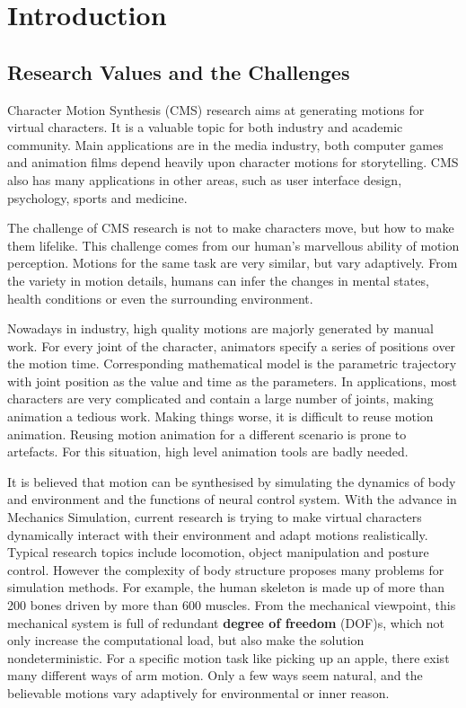 \chapter{Introduction}
\section{Research Values and the Challenges}
Character Motion Synthesis (CMS) research aims at generating motions for virtual characters.
It is a valuable topic for both industry and academic community. 
Main applications are in the media industry, both computer games and animation films depend heavily upon character motions for storytelling.  
CMS also has many applications in other areas, such as user interface design, psychology, sports and medicine.

The challenge of CMS research is not to make characters move, but how to make them lifelike. 
This challenge comes from our human's marvellous ability of motion perception. 
Motions for the same task are very similar, but vary adaptively.
From the variety in motion details, humans can infer the changes in mental states, health conditions or even the surrounding environment. 

Nowadays in industry, high quality motions are majorly generated by manual work. 
For every joint of the character, animators specify a series of positions over the motion time.
Corresponding mathematical model is the parametric trajectory with joint position as the value and time as the parameters.
In applications, most characters are very complicated and contain a large number of joints, making animation a tedious work.
Making things worse, it is difficult to reuse motion animation.
Reusing motion animation for a different scenario is prone to artefacts.
For this situation, high level animation tools are badly needed. 

It is believed that motion can be synthesised by simulating the dynamics of body and environment and the functions of neural control system.  
With the advance in Mechanics Simulation, current research is trying to make virtual characters dynamically interact with their environment and adapt motions realistically.
Typical research topics include locomotion, object manipulation and posture control.
However the complexity of body structure proposes many problems for simulation methods.
For example, the human skeleton is made up of more than 200 bones driven by more than 600 muscles.
From the mechanical viewpoint,  
this mechanical system is full of redundant \textbf{degree of freedom} (DOF)s,  which not only increase the computational load, but also make the solution nondeterministic. 
For a specific motion task like picking up an apple, there exist many different ways of arm motion. 
Only a few ways seem natural, and the believable motions vary adaptively for environmental or inner reason.

